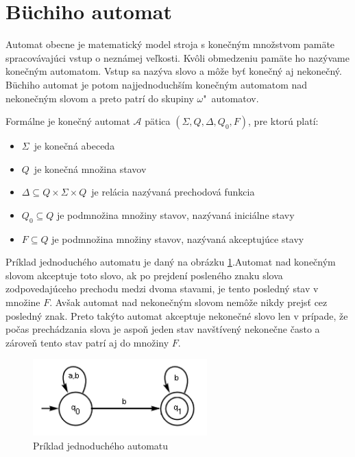 \documentclass[11pt,final,oneside]{fithesis}
\begin{document}
\section{B\"uchiho automat}	%
Automat obecne je matematick\' y model stroja s kone\v cn\' ym mno\v zstvom pam\" ate spracov\' avaj\' uci vstup o nezn\' amej ve\v lkosti. 
Kv\^ oli obmedzeniu pam\" ate ho naz\' yvame kone\v cn\' ym automatom. Vstup sa naz\' yva slovo a m\^ o\v ze by\v t kone\v cn\' y aj nekone\v cn\' y.
B\" uchiho automat je potom najjednoduch\v s\' im kone\v cn\'ym automatom nad nekone\v cn\'ym slovom a preto patr\'i do skupiny {$\omega$"~au\-to\-matov}.

Form\'alne je kone\v cn\' y automat $\mathcal{A}$ p\" atica $(\Sigma, Q, \Delta, Q_0, F)$, pre ktor\' u plat\'i:
\begin{itemize}
\item $\Sigma$\ je kone\v cn\'a abeceda
\item $Q$\ je kone\v cn\'a mno\v zina stavov
\item $\Delta \subseteq Q \times \Sigma \times Q$\ je rel\' acia naz\'yvan\'a prechodov\'a funkcia
\item $Q_0 \subseteq Q$ je podmno\v zina mno\v ziny stavov, naz\' yvan\' a inici\' alne stavy
\item $F \subseteq Q$ je podmno\v zina mno\v ziny stavov, naz\'yvan\'a akceptuj\'uce stavy
\end{itemize}
Pr\'iklad jednoduch\'eho automatu je dan\'y na obr\'azku \ref{fig:buchi}.Automat nad kone\v cn\'ym slovom akceptuje toto slovo, ak po prejden\' i poslen\'eho znaku slova zodpovedaj\' uceho prechodu medzi dvoma stavami, 
je tento posledn\' y stav v mno\v zine $F$. Av\v sak automat nad nekone\v cn\' ym slovom nem\^ o\v ze nikdy prejs\v t cez posledn\' y znak. Preto tak\' yto 
automat akceptuje nekone\v cn\' e slovo len v pr\' ipade, \v ze po\v cas prech\' adzania slova je aspo\v n jeden stav nav\v st\'iven\'y nekone\v cne \v casto 
a z\'arove\v n tento stav patr\'i aj do mno\v ziny $F$.
\begin{figure}[h]
	\centering
	\includegraphics[width=0.6\textwidth]{Buchi01}
	\caption{Pr\'iklad jednoduch\'eho automatu}
	\label{fig:buchi}
\end{figure}
\end{document}

